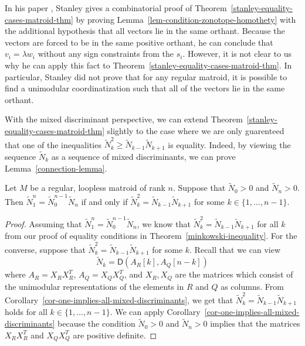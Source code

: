 \documentclass{puthesis-UG}
\begin{document}
\begin{remark}
	In his paper \cite{STANLEY}, Stanley gives a combinatorial proof of Theorem~\ref{stanley-equality-cases-matroid-thm} by proving Lemma~\ref{lem-condition-zonotope-homothety} with the additional hypothesis that all vectors lie in the same orthant. Because the vectors are forced to be in the same positive orthant, he can conclude that $v_i = \lambda w_i$ without any sign constraints from the $s_i$. However, it is not clear to us why he can apply this fact to Theorem~\ref{stanley-equality-cases-matroid-thm}. In particular, Stanley did not prove that for any regular matroid, it is possible to find a unimodular coordinatization such that all of the vectors lie in the same orthant. 
\end{remark}

With the mixed discriminant perspective, we can extend Theorem~\ref{stanley-equality-cases-matroid-thm} slightly to the case where we are only guarenteed that one of the inequalities $\widetilde{N}_k^2 \geq \widetilde{N}_{k-1} \widetilde{N}_{k+1}$ is equality. Indeed, by viewing the sequence $\widetilde{N}_k$ as a sequence of mixed discriminants, we can prove Lemma~\ref{connection-lemma}. 

\begin{lem} \label{connection-lemma}
	Let $M$ be a regular, loopless matroid of rank $n$. Suppose that $\widetilde{N}_0 > 0$ and $\widetilde{N}_n > 0$. Then $\widetilde{N}_1^n = \widetilde{N}_0^{n-1} \widetilde{N}_n$ if and only if $\widetilde{N}_k^2 = \widetilde{N}_{k-1} \widetilde{N}_{k+1}$ for some $k \in \{1, \ldots, n-1\}$.
\end{lem}

\begin{proof}
	Assuming that $\widetilde{N}_1^n = \widetilde{N}_0^{n-1} \widetilde{N}_n$, we know that $\widetilde{N}_k^2 = \widetilde{N}_{k-1} \widetilde{N}_{k+1}$ for all $k$ from our proof of equality conditions in Theorem~\ref{minkowski-inequality}. For the converse, suppose that $\widetilde{N}_k^2 = \widetilde{N}_{k-1} \widetilde{N}_{k+1}$ for some $k$. Recall that we can view 
	\[
		\widetilde{N}_k = \mathsf{D} (A_R [k], A_Q [n-k])
	\]
	where $A_R = X_R X_R^T$, $A_Q = X_Q X_Q^T$, and $X_R, X_Q$ are the matrices which consist of the unimodular representations of the elements in $R$ and $Q$ as columns. From Corollary~\ref{cor-one-implies-all-mixed-discriminants}, we get that $\widetilde{N}_k^2 = \widetilde{N}_{k-1} \widetilde{N}_{k+1}$ holds for all $k \in \{1, \ldots, n-1\}$. We can apply Corollary~\ref{cor-one-implies-all-mixed-discriminants} because the condition $\widetilde{N}_0 > 0$ and $\widetilde{N}_n > 0$ implies that the matrices $X_R X_R^T$ and $X_QX_Q^T$ are positive definite. 
\end{proof}
\end{document}
